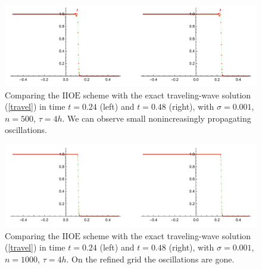 \documentclass[a4paper,12pt,twoside]{report}%
\begin{document}
\begin{figure}[h!]
	\centering
	\includegraphics[width=\textwidth]{figures/travelsig0015002448}
	\caption{Comparing the $ \mathrm{IIOE} $ scheme with the exact traveling-wave solution {\rm (\ref{travel})} in time $ t=0.24 $ (left) and $ t = 0.48 $ (right), with $ \sigma=0.001 $, $ n=500 $, $ \tau=4h $. We can observe small nonincreasingly propagating oscillations.}
	\label{fig:travel_sig1/1000_n500}
\end{figure}

\begin{figure}[h!]
	\centering
	\includegraphics[width=\textwidth]{figures/travelsig0011000024048}
	\caption{Comparing the $ \mathrm{IIOE} $ scheme with the exact traveling-wave solution {\rm (\ref{travel})} in time $ t=0.24 $ (left) and $ t = 0.48 $ (right), with $ \sigma=0.001 $, $ n=1000 $, $ \tau=4h $. On the refined grid the oscillations are gone.}
	\label{fig:travel_sig1/1000_n1000}
\end{figure}
\newpage
\end{document}
